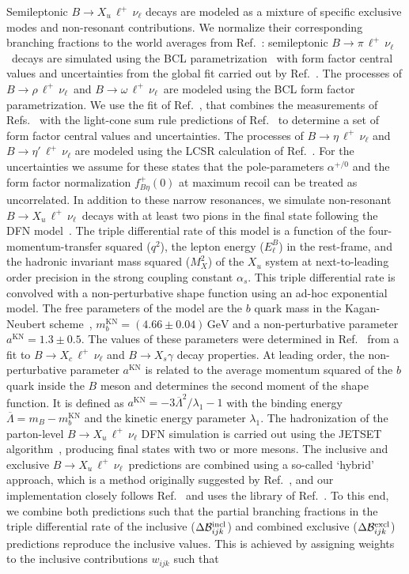 \documentclass[twocolumn,aps,prd,superscriptaddress,nofootinbib,floatfix,preprintnumbers,a4]{revtex4-1}
\newcommand{\bulnu}{\ensuremath{B \to X_u \, \ell^+\, \nu_{\ell}}\xspace}
\newcommand{\bclnu}{\ensuremath{B \to X_c \, \ell^+\, \nu_{\ell}}\xspace}
\newcommand{\bpilnu}{\ensuremath{B \to \pi \, \ell^+\,\nu_{\ell}}\xspace}
\newcommand{\brholnu}{\ensuremath{B \to \rho \, \ell^+\,\nu_{\ell}}\xspace}
\newcommand{\bomegalnu}{\ensuremath{B \to \omega \, \ell^+\,\nu_{\ell}}\xspace}
\newcommand{\betalnu}{\ensuremath{B \to \eta \, \ell^+\,\nu_{\ell}}\xspace}
\newcommand{\betaplnu}{\ensuremath{B \to \eta' \, \ell^+\,\nu_{\ell}}\xspace}
\begin{document}
Semileptonic \bulnu decays are modeled as a mixture of specific exclusive modes and non-resonant contributions. We normalize their corresponding branching fractions to the world averages from Ref.~\cite{pdg:2020}: semileptonic \bpilnu\ decays are simulated using the BCL parametrization~\citep{Bourrely:2008za} with form factor central values and uncertainties from the global fit carried out by Ref.~\citep{Lattice:2015tia}. The processes of \brholnu\ and \bomegalnu\ are modeled using the BCL form factor parametrization. We use the fit of Ref.~\cite{Bernlochner:2021rel}, that combines the measurements of Refs.~\cite{Sibidanov:2013rkk,Lees:2012mq,delAmoSanchez:2010af} with the light-cone sum rule predictions of Ref.~\cite{Bharucha:2012wy} to determine a set of form factor central values and uncertainties. The processes of \betalnu and \betaplnu are modeled using the LCSR calculation of Ref.~\cite{Duplancic:2015zna}. For the uncertainties we assume for these states that the pole-parameters $\alpha^{+/0}$ and the form factor normalization $f_{B\eta}^+(0)$ at maximum recoil can be treated as uncorrelated. In addition to these narrow resonances, we simulate non-resonant \bulnu\ decays with at least two pions in the final state following the DFN model~\cite{DeFazio:1999ptt}. The triple differential rate of this model is a function of the four-momentum-transfer squared ($q^2$), the lepton energy ($E_\ell^B$) in the \PB rest-frame, and the hadronic invariant mass squared ($M_X^2$) of the $X_u$ system at next-to-leading order precision in the strong coupling constant $\alpha_s$. This triple differential rate is convolved with a non-perturbative shape function using an ad-hoc exponential model. The free parameters of the model are the $b$ quark mass in the Kagan-Neubert scheme~\cite{Kagan:1998ym}, $m_{b}^{\text{KN}} = (4.66 \pm 0.04)\,\mathrm{GeV}$ and a non-perturbative parameter $a^{\text{KN}} = 1.3 \pm 0.5$. The values of these parameters were determined in Ref.~\cite{Buchmuller:2005zv} from a fit to $\bclnu$ and $B \to X_s \gamma$ decay properties. At leading order, the non-perturbative parameter $a^{\text{KN}}$ is related to the average momentum squared of the $b$ quark inside the $B$ meson and determines the second moment of the shape function. It is defined as $a^{\text{KN}} = - 3 \overline \Lambda^2 / \lambda_1 -1$ with the binding energy $\overline \Lambda = m_B - m_b^{\text{KN}}$ and the kinetic energy parameter $\lambda_1$. The hadronization of the parton-level \bulnu DFN simulation is carried out using the JETSET algorithm~\cite{SJOSTRAND199474}, producing final states with two or more mesons. The inclusive and exclusive \bulnu\ predictions are combined using a so-called `hybrid' approach, which is a method originally suggested by Ref.~\cite{hybrid}, and our implementation closely follows Ref.~\cite{Prim:2019gtj} and uses the library of Ref.~\cite{markus_prim_2020_3965699}. To this end, we combine both predictions such that the partial branching fractions in the triple differential rate of the inclusive ($ \Delta \mathcal{B}_{ijk}^{\rm incl}$) and combined exclusive ($ \Delta \mathcal{B}_{ijk}^{\rm excl}$) predictions reproduce the inclusive values. This is achieved by assigning weights to the inclusive contributions $w_{ijk}$ such that
\end{document}
